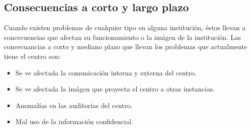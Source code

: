 \subsection{Consecuencias a corto y largo plazo}

Cuando existen problemas de cualquier tipo en alguna institución, éstos llevan a concecuencias que afectan su funcionamiento o la imágen de la institución. Las concecuancias a corto y mediano plazo que llevan los problemas que actualmente tiene el centro son:

\begin{itemize}
	\item Se ve afectada la comunicación interna y externa del centro.
	\item Se ve afectada la imágen que proyecta el centro a otras instancias.
	\item Anomalías en las auditorias del centro.
	\item Mal uso de la información confidencial.
\end{itemize}
